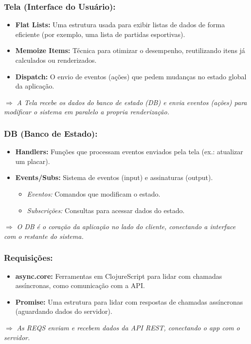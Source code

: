 \documentclass[a4paper,times,12pt]{article}
\begin{document}
\subsubsection{Tela (Interface do Usuário):}
\begin{itemize}
  \item \textbf{Flat Lists:} Uma estrutura usada para exibir listas de dados de forma eficiente (por exemplo, uma lista de partidas esportivas).
  \item \textbf{Memoize Items:} Técnica para otimizar o desempenho, reutilizando itens já calculados ou renderizados.
  \item \textbf{Dispatch:} O envio de eventos (ações) que pedem mudanças no estado global da aplicação.
\end{itemize}
\noindent
\(\Rightarrow\) \textit{A Tela recebe os dados do banco de estado (DB) e envia eventos (ações) para modificar o sistema em paralelo a propria renderização.}

\subsubsection{DB (Banco de Estado):}
\begin{itemize}
  \item \textbf{Handlers:} Funções que processam eventos enviados pela tela (ex.: atualizar um placar).
  \item \textbf{Events/Subs:} Sistema de eventos (input) e assinaturas (output).
    \begin{itemize}
      \item \textit{Eventos:} Comandos que modificam o estado.
      \item \textit{Subscrições:} Consultas para acessar dados do estado.
    \end{itemize}
\end{itemize}
\noindent
\(\Rightarrow\) \textit{O DB é o coração da aplicação no lado do cliente, conectando a interface com o restante do sistema.}

\subsubsection{Requisições:}
\begin{itemize}
  \item \textbf{async.core:} Ferramentas em ClojureScript para lidar com chamadas assíncronas, como comunicação com a API.
  \item \textbf{Promise:} Uma estrutura para lidar com respostas de chamadas assíncronas (aguardando dados do servidor).
\end{itemize}
\noindent
\(\Rightarrow\) \textit{As REQS enviam e recebem dados da API REST, conectando o app com o servidor.}
\end{document}
